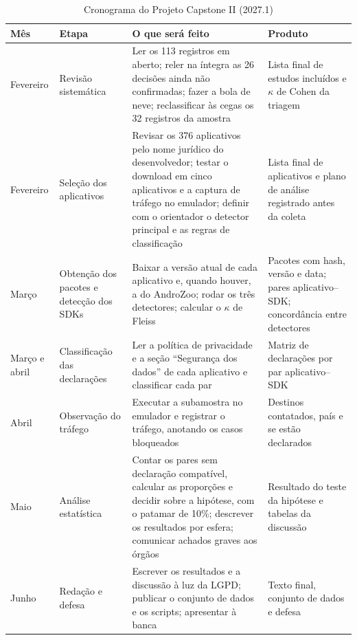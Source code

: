 \begin{table}[htbp]
\centering
\footnotesize
\caption{Cronograma do Projeto Capstone II (2027.1)}\label{tab:cronograma}
\begin{tabularx}{\textwidth}{|l|>{\raggedright\arraybackslash}p{2.6cm}|>{\raggedright\arraybackslash}X|>{\raggedright\arraybackslash}p{3.8cm}|}
\hline
\textbf{Mês} & \textbf{Etapa} & \textbf{O que será feito} & \textbf{Produto} \\ \hline
Fevereiro & Revisão sistemática & Ler os 113 registros em aberto; reler na íntegra as 26 decisões ainda não confirmadas; fazer a bola de neve; reclassificar às cegas os 32 registros da amostra & Lista final de estudos incluídos e $\kappa$ de Cohen da triagem \\ \hline
Fevereiro & Seleção dos aplicativos & Revisar os 376 aplicativos pelo nome jurídico do desenvolvedor; testar o download em cinco aplicativos e a captura de tráfego no emulador; definir com o orientador o detector principal e as regras de classificação & Lista final de aplicativos e plano de análise registrado antes da coleta \\ \hline
Março & Obtenção dos pacotes e detecção dos SDKs & Baixar a versão atual de cada aplicativo e, quando houver, a do AndroZoo; rodar os três detectores; calcular o $\kappa$ de Fleiss & Pacotes com hash, versão e data; pares aplicativo--SDK; concordância entre detectores \\ \hline
Março e abril & Classificação das declarações & Ler a política de privacidade e a seção ``Segurança dos dados'' de cada aplicativo e classificar cada par & Matriz de declarações por par aplicativo--SDK \\ \hline
Abril & Observação do tráfego & Executar a subamostra no emulador e registrar o tráfego, anotando os casos bloqueados & Destinos contatados, país e se estão declarados \\ \hline
Maio & Análise estatística & Contar os pares sem declaração compatível, calcular as proporções e decidir sobre a hipótese, com o patamar de 10\%; descrever os resultados por esfera; comunicar achados graves aos órgãos & Resultado do teste da hipótese e tabelas da discussão \\ \hline
Junho & Redação e defesa & Escrever os resultados e a discussão à luz da LGPD; publicar o conjunto de dados e os scripts; apresentar à banca & Texto final, conjunto de dados e defesa \\ \hline
\end{tabularx}
\end{table}

